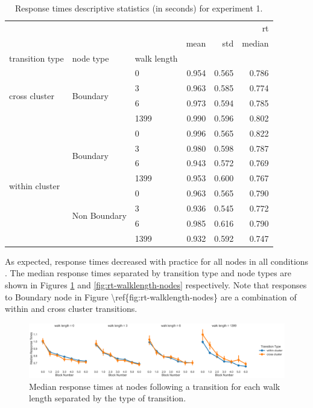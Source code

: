 \begin{table}	
	\centering
	\caption{Response times descriptive statistics (in seconds) for experiment 1.}
	\label{tab:exp1-rt-stats}
	\begin{tabular}{lllrrr}
		\toprule
		 &  &  & \multicolumn{3}{r}{rt} \\
		 &  &  & mean & std & median \\
		transition type & node type & walk length &  &  &  \\
		\midrule
		\multirow[t]{4}{*}{cross cluster} & \multirow[t]{4}{*}{Boundary} & 0 & 0.954 & 0.565 & 0.786 \\
		 &  & 3 & 0.963 & 0.585 & 0.774 \\
		 &  & 6 & 0.973 & 0.594 & 0.785 \\
		 &  & 1399 & 0.990 & 0.596 & 0.802 \\
		\cline{1-6} \cline{2-6}
		\multirow[t]{8}{*}{within cluster} & \multirow[t]{4}{*}{Boundary} & 0 & 0.996 & 0.565 & 0.822 \\
		 &  & 3 & 0.980 & 0.598 & 0.787 \\
		 &  & 6 & 0.943 & 0.572 & 0.769 \\
		 &  & 1399 & 0.953 & 0.600 & 0.767 \\
		\cline{2-6}
		 & \multirow[t]{4}{*}{Non Boundary} & 0 & 0.963 & 0.565 & 0.790 \\
		 &  & 3 & 0.936 & 0.545 & 0.772 \\
		 &  & 6 & 0.985 & 0.616 & 0.790 \\
		 &  & 1399 & 0.932 & 0.592 & 0.747 \\
		\cline{1-6} \cline{2-6}
		\bottomrule
		\end{tabular}
	\end{table}
	

As expected, response times decreased with practice for all nodes in all conditions . The median response times separated by transition type and node types are shown in Figures \ref{fig:rt-walklength-transitions} and \ref{fig:rt-walklength-nodes} respectively. \ac{Note that responses to Boundary node in Figure \ref{fig:rt-walklength-nodes} are a combination of within and cross cluster transitions.}

\begin{figure}
	\centering
	\includegraphics[width = \textwidth]{chapter_notebooks/chapter_2/figures/median_rts_transitiontype.png}
	\caption{Median response times \ac{at nodes following a transition} for each walk length separated by the type of transition.}
	\label{fig:rt-walklength-transitions}
\end{figure}



